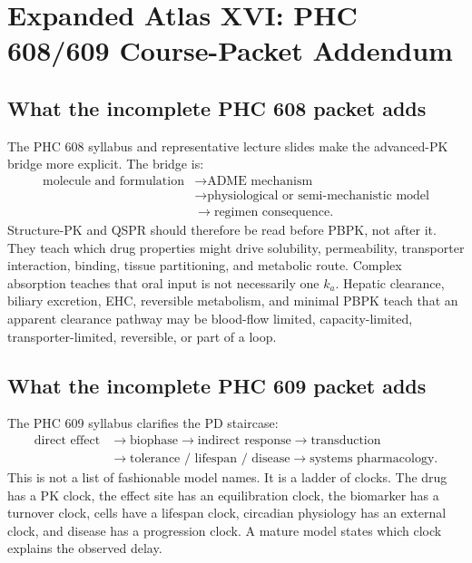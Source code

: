 \section{Expanded Atlas XVI: PHC 608/609 Course-Packet Addendum}

\subsection{What the incomplete PHC 608 packet adds}

The PHC 608 syllabus and representative lecture slides make the advanced-PK bridge more explicit. The bridge is:
\[
  \begin{aligned}
  \text{molecule and formulation}
  &\to
  \text{ADME mechanism}\\
  &\to
  \text{physiological or semi-mechanistic model}\\
  &\to
  \text{regimen consequence}.
  \end{aligned}
\]
Structure-PK and QSPR should therefore be read before PBPK, not after it. They teach which drug properties might drive solubility, permeability, transporter interaction, binding, tissue partitioning, and metabolic route. Complex absorption teaches that oral input is not necessarily one \(k_a\). Hepatic clearance, biliary excretion, EHC, reversible metabolism, and minimal PBPK teach that an apparent clearance pathway may be blood-flow limited, capacity-limited, transporter-limited, reversible, or part of a loop.

\subsection{What the incomplete PHC 609 packet adds}

The PHC 609 syllabus clarifies the PD staircase:
\[
  \begin{aligned}
  \text{direct effect}
  &\to
  \text{biophase}
  \to
  \text{indirect response}
  \to
  \text{transduction}\\
  &\to
  \text{tolerance / lifespan / disease}
  \to
  \text{systems pharmacology}.
  \end{aligned}
\]
This is not a list of fashionable model names. It is a ladder of clocks. The drug has a PK clock, the effect site has an equilibration clock, the biomarker has a turnover clock, cells have a lifespan clock, circadian physiology has an external clock, and disease has a progression clock. A mature model states which clock explains the observed delay.

